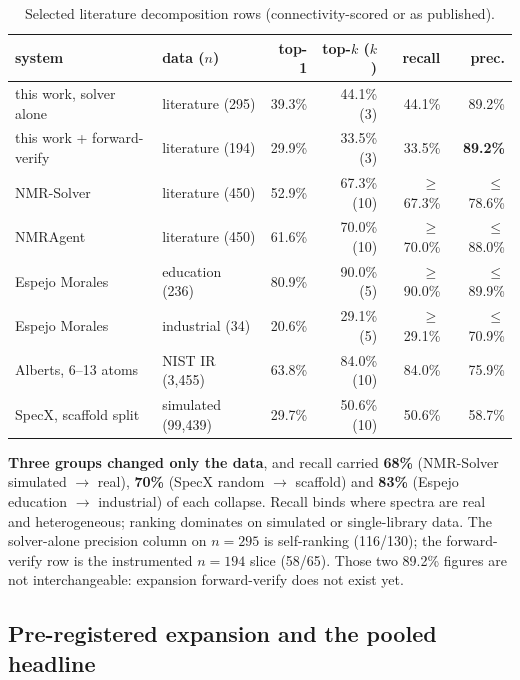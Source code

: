 \documentclass{article}
\begin{document}
\begin{table}[t]
\caption{Selected literature decomposition rows (connectivity-scored or as published).}
\label{tab:lit-decomp}
\centering
\scriptsize
\setlength{\tabcolsep}{3pt}
\begin{tabular}{@{}p{2.6cm}p{2.4cm}rrrr@{}}
\toprule
system & data ($n$) & top-1 & top-$k$ ($k$) & recall & prec. \\
\midrule
this work, solver alone & literature (295) & 39.3\% & 44.1\% (3) & 44.1\% & 89.2\% \\
this work + forward-verify & literature (194) & 29.9\% & 33.5\% (3) & 33.5\% & \textbf{89.2\%} \\
NMR-Solver~\citep{jin2025nmrsolver} & literature (450) & 52.9\% & 67.3\% (10) & $\geq$67.3\% & $\leq$78.6\% \\
NMRAgent~\citep{fang2026nmragent} & literature (450) & 61.6\% & 70.0\% (10) & $\geq$70.0\% & $\leq$88.0\% \\
Espejo Morales~\citep{espejo2026agentic} & education (236) & 80.9\% & 90.0\% (5) & $\geq$90.0\% & $\leq$89.9\% \\
Espejo Morales~\citep{espejo2026agentic} & industrial (34) & 20.6\% & 29.1\% (5) & $\geq$29.1\% & $\leq$70.9\% \\
Alberts, 6--13 atoms~\citep{alberts2025benchmarks} & NIST IR (3,455) & 63.8\% & 84.0\% (10) & 84.0\% & 75.9\% \\
SpecX, scaffold split~\citep{xiang2026specx} & simulated (99,439) & 29.7\% & 50.6\% (10) & 50.6\% & 58.7\% \\
\bottomrule
\end{tabular}
\end{table}

\textbf{Three groups changed only the data}, and recall carried \textbf{68\%} (NMR-Solver
simulated $\to$ real), \textbf{70\%} (SpecX random $\to$ scaffold) and \textbf{83\%}
(Espejo education $\to$ industrial) of each collapse.
Recall binds where spectra are real and heterogeneous; ranking dominates on simulated or
single-library data.
The solver-alone precision column on $n{=}295$ is self-ranking (116/130); the
forward-verify row is the instrumented $n{=}194$ slice (58/65). Those two 89.2\% figures
are not interchangeable: expansion forward-verify does not exist yet.

\subsection{Pre-registered expansion and the pooled headline}
\label{sec:expansion}
\end{document}

